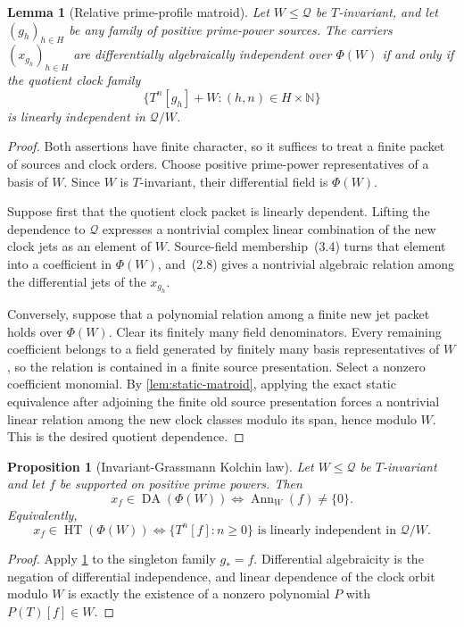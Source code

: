 \documentclass[11pt]{article}
\newtheorem{proposition}[theorem]{Proposition}
\newtheorem{lemma}[theorem]{Lemma}
\theoremstyle{definition}
\theoremstyle{remark}
\newcommand{\N}{\mathbb N}
\newcommand{\Q}{\mathcal Q}
\newcommand{\DA}{\operatorname{DA}}
\newcommand{\HT}{\operatorname{HT}}
\newcommand{\Ann}{\operatorname{Ann}}
\begin{document}
\begin{lemma}[Relative prime-profile matroid]\label{lem:relative-matroid}
Let $W\leq\Q$ be $T$-invariant, and let $(g_h)_{h\in H}$ be any family of positive prime-power
sources.  The carriers $(x_{g_h})_{h\in H}$ are differentially algebraically independent over
$\Phi(W)$ if and only if the quotient clock family
\[
  \bigl\{T^n[g_h]+W:(h,n)\in H\times\N\bigr\}                  \tag{4.4}
\]
is linearly independent in $\Q/W$.
\end{lemma}

\begin{proof}
Both assertions have finite character, so it suffices to treat a finite packet of sources and
clock orders.  Choose positive prime-power representatives of a basis of $W$.  Since $W$ is
$T$-invariant, their differential field is $\Phi(W)$.

Suppose first that the quotient clock packet is linearly dependent.  Lifting the dependence to
$\Q$ expresses a nontrivial complex linear combination of the new clock jets as an element of
$W$.  Source-field membership~(3.4) turns that element into a coefficient in $\Phi(W)$, and~(2.8)
gives a nontrivial algebraic relation among the differential jets of the $x_{g_h}$.

Conversely, suppose that a polynomial relation among a finite new jet packet holds over
$\Phi(W)$.  Clear its finitely many field denominators.  Every remaining coefficient belongs to a
field generated by finitely many basis representatives of $W$, so the relation is contained in a
finite source presentation.  Select a nonzero coefficient monomial.  By
\cref{lem:static-matroid}, applying the exact static equivalence after adjoining the finite old
source presentation forces a nontrivial
linear relation among the new clock classes modulo its span, hence modulo $W$.  This is the desired
quotient dependence.
\end{proof}

\begin{proposition}[Invariant-Grassmann Kolchin law]\label{prop:kolchin}
Let $W\leq\Q$ be $T$-invariant and let $f$ be supported on positive prime powers.  Then
\[
  x_f\in\DA(\Phi(W))
  \Longleftrightarrow
  \Ann_W(f)\ne\{0\}.                                           \tag{4.5}
\]
Equivalently,
\[
  x_f\in\HT(\Phi(W))
  \Longleftrightarrow
  \{T^n[f]:n\geq0\}\text{ is linearly independent in }\Q/W.   \tag{4.6}
\]
\end{proposition}

\begin{proof}
Apply \cref{lem:relative-matroid} to the singleton family $g_*=f$.  Differential algebraicity is
the negation of differential independence, and linear dependence of the clock orbit modulo $W$
is exactly the existence of a nonzero polynomial $P$ with $P(T)[f]\in W$.
\end{proof}
\end{document}
